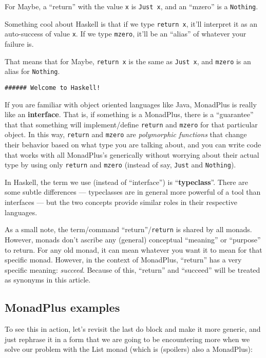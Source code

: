 \documentclass[]{article}
\begin{document}
For Maybe, a ``return'' with the value \texttt{x} is \texttt{Just\ x},
and an ``mzero'' is a \texttt{Nothing}.

Something cool about Haskell is that if we type \texttt{return\ x},
it'll interpret it as an auto-success of value \texttt{x}. If we type
\texttt{mzero}, it'll be an ``alias'' of whatever your failure is.

That means that for Maybe, \texttt{return\ x} is the same as
\texttt{Just\ x}, and \texttt{mzero} is an alias for \texttt{Nothing}.

\begin{verbatim}
###### Welcome to Haskell!
\end{verbatim}

If you are familiar with object oriented languages like Java, MonadPlus
is really like an \textbf{interface}. That is, if something is a
MonadPlus, there is a ``guarantee'' that that something will
implement/define \texttt{return} and \texttt{mzero} for that particular
object. In this way, \texttt{return} and \texttt{mzero} are
\emph{polymorphic functions} that change their behavior based on what
type you are talking about, and you can write code that works with all
MonadPlus's generically without worrying about their actual type by
using only \texttt{return} and \texttt{mzero} (instead of say,
\texttt{Just} and \texttt{Nothing}).

In Haskell, the term we use (instead of ``interface'') is
``\textbf{typeclass}''. There are some subtle differences ---
typeclasses are in general more powerful of a tool than interfaces ---
but the two concepts provide similar roles in their respective
languages.

As a small note, the term/command ``return''/\texttt{return} is shared
by all monads. However, monads don't ascribe any (general) conceptual
``meaning'' or ``purpose'' to return. For any old monad, it can mean
whatever you want it to mean for that specific monad. However, in the
context of MonadPlus, ``return'' has a very specific meaning:
\emph{succeed}. Because of this, ``return'' and ``succeed'' will be
treated as synonyms in this article.

\subsection{MonadPlus examples}\label{monadplus-examples}

To see this in action, let's revisit the last do block and make it more
generic, and just rephrase it in a form that we are going to be
encountering more when we solve our problem with the List monad (which
is (spoilers) also a MonadPlus):
\end{document}
